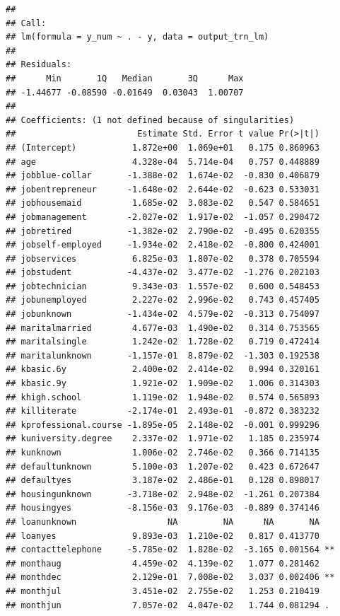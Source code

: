 \documentclass[
]{article}
\begin{document}
\begin{verbatim}
## 
## Call:
## lm(formula = y_num ~ . - y, data = output_trn_lm)
## 
## Residuals:
##      Min       1Q   Median       3Q      Max 
## -1.44677 -0.08590 -0.01649  0.03043  1.00707 
## 
## Coefficients: (1 not defined because of singularities)
##                        Estimate Std. Error t value Pr(>|t|)    
## (Intercept)           1.872e+00  1.069e+01   0.175 0.860963    
## age                   4.328e-04  5.714e-04   0.757 0.448889    
## jobblue-collar       -1.388e-02  1.674e-02  -0.830 0.406879    
## jobentrepreneur      -1.648e-02  2.644e-02  -0.623 0.533031    
## jobhousemaid          1.685e-02  3.083e-02   0.547 0.584651    
## jobmanagement        -2.027e-02  1.917e-02  -1.057 0.290472    
## jobretired           -1.382e-02  2.790e-02  -0.495 0.620355    
## jobself-employed     -1.934e-02  2.418e-02  -0.800 0.424001    
## jobservices           6.825e-03  1.807e-02   0.378 0.705594    
## jobstudent           -4.437e-02  3.477e-02  -1.276 0.202103    
## jobtechnician         9.343e-03  1.557e-02   0.600 0.548453    
## jobunemployed         2.227e-02  2.996e-02   0.743 0.457405    
## jobunknown           -1.434e-02  4.579e-02  -0.313 0.754097    
## maritalmarried        4.677e-03  1.490e-02   0.314 0.753565    
## maritalsingle         1.242e-02  1.728e-02   0.719 0.472414    
## maritalunknown       -1.157e-01  8.879e-02  -1.303 0.192538    
## kbasic.6y             2.400e-02  2.414e-02   0.994 0.320161    
## kbasic.9y             1.921e-02  1.909e-02   1.006 0.314303    
## khigh.school          1.119e-02  1.948e-02   0.574 0.565893    
## killiterate          -2.174e-01  2.493e-01  -0.872 0.383232    
## kprofessional.course -1.895e-05  2.148e-02  -0.001 0.999296    
## kuniversity.degree    2.337e-02  1.971e-02   1.185 0.235974    
## kunknown              1.006e-02  2.746e-02   0.366 0.714135    
## defaultunknown        5.100e-03  1.207e-02   0.423 0.672647    
## defaultyes            3.187e-02  2.486e-01   0.128 0.898017    
## housingunknown       -3.718e-02  2.948e-02  -1.261 0.207384    
## housingyes           -8.156e-03  9.176e-03  -0.889 0.374146    
## loanunknown                  NA         NA      NA       NA    
## loanyes               9.893e-03  1.210e-02   0.817 0.413770    
## contacttelephone     -5.785e-02  1.828e-02  -3.165 0.001564 ** 
## monthaug              4.459e-02  4.139e-02   1.077 0.281462    
## monthdec              2.129e-01  7.008e-02   3.037 0.002406 ** 
## monthjul              3.451e-02  2.755e-02   1.253 0.210419    
## monthjun              7.057e-02  4.047e-02   1.744 0.081294 .  

\end{verbatim}
\end{document}
